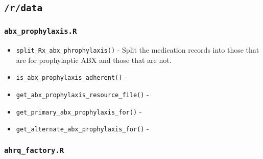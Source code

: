 \documentclass[
]{book}
\providecommand{\tightlist}{%
  \setlength{\itemsep}{0pt}\setlength{\parskip}{0pt}}
\begin{document}
\hypertarget{rdata-1}{%
\subsection{\texorpdfstring{\texttt{/r/data}}{/r/data}}\label{rdata-1}}

\hypertarget{abx_prophylaxis.r}{%
\subsubsection{\texorpdfstring{\texttt{abx\_prophylaxis.R}}{abx\_prophylaxis.R}}\label{abx_prophylaxis.r}}

\begin{itemize}
\tightlist
\item
  \texttt{split\_Rx\_abx\_phrophylaxis()} - Split the medication records into those that are for prophylaptic ABX and those that are not.
\item
  \texttt{is\_abx\_prophylaxis\_adherent()} -
\item
  \texttt{get\_abx\_prophylaxis\_resource\_file()} -
\item
  \texttt{get\_primary\_abx\_prophylaxis\_for()} -
\item
  \texttt{get\_alternate\_abx\_prophylaxis\_for()} -
\end{itemize}

\hypertarget{ahrq_factory.r}{%
\subsubsection{\texorpdfstring{\texttt{ahrq\_factory.R}}{ahrq\_factory.R}}\label{ahrq_factory.r}}
\end{document}

